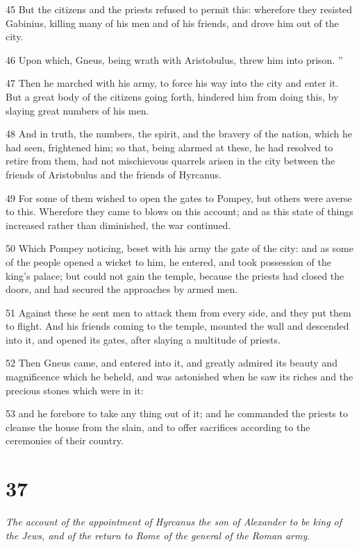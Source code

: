 45 But the citizens and the priests refused to permit this: wherefore they resisted Gabinius, killing many of his men and of his friends, and drove him out of the city. 

46 Upon which, Gneus, being wrath with Aristobulus, threw him into prison. ”

47 Then he marched with his army, to force his way into the city and enter it. But a great body of the citizens going forth, hindered him from doing this, by slaying great numbers of his men. 

48 And in truth, the numbers, the spirit, and the bravery of the nation, which he had seen, frightened him; so that, being alarmed at these, he had resolved to retire from them, had not mischievous quarrels arisen in the city between the friends of Aristobulus and the friends of Hyrcanus. 

49 For some of them wished to open the gates to Pompey, but others were averse to this. Wherefore they came to blows on this account; and as this state of things increased rather than diminished, the war continued. 

50 Which Pompey noticing, beset with his army the gate of the city: and as some of the people opened a wicket to him, he entered, and took possession of the king’s palace; but could not gain the temple, because the priests had closed the doors, and had secured the approaches by armed men. 

51 Against these he sent men to attack them from every side, and they put them to flight. And his friends coming to the temple, mounted the wall and descended into it, and opened its gates, after slaying a multitude of priests. 

52 Then Gneus came, and entered into it, and greatly admired its beauty and magnificence which he beheld, and was astonished when he saw its riches and the precious stones which were in it: 

53 and he forebore to take any thing out of it; and he commanded the priests to cleanse the house from the slain, and to offer sacrifices according to the ceremonies of their country. 

\chapter{37}

\par \textit{The account of the appointment of Hyrcanus the son of Alexander to be king of the Jews, and of the return to Rome of the general of the Roman army.}

